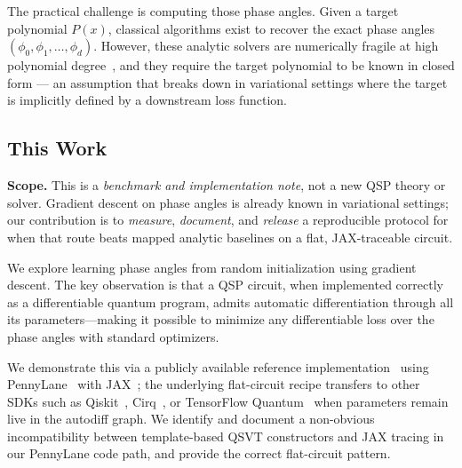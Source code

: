 \documentclass[11pt,a4paper]{article}
\begin{document}
The practical challenge is computing those phase angles. Given a target polynomial $P(x)$, classical algorithms exist to recover the exact phase angles $(\phi_0, \phi_1, \ldots, \phi_d)$. However, these analytic solvers are numerically fragile at high polynomial degree~\cite{haah2019product, chao2020finding}, and they require the target polynomial to be known in closed form --- an assumption that breaks down in variational settings where the target is implicitly defined by a downstream loss function.

\subsection{This Work}

\textbf{Scope.} This is a \emph{benchmark and implementation note}, not a new QSP theory or solver. Gradient descent on phase angles is already known in variational settings; our contribution is to \emph{measure}, \emph{document}, and \emph{release} a reproducible protocol for when that route beats mapped analytic baselines on a flat, JAX-traceable circuit.

We explore learning phase angles from random initialization using gradient descent. The key observation is that a QSP circuit, when implemented correctly as a differentiable quantum program, admits automatic differentiation through all its parameters---making it possible to minimize any differentiable loss over the phase angles with standard optimizers.

We demonstrate this via a publicly available reference implementation~\cite{peili_trainable_qsp_2026} using PennyLane~\cite{pennylane2022} with JAX~\cite{jax2018github}; the underlying flat-circuit recipe transfers to other SDKs such as Qiskit~\cite{qiskit2024}, Cirq~\cite{cirq2024}, or TensorFlow Quantum~\cite{broughton2020tfq} when parameters remain live in the autodiff graph. We identify and document a non-obvious incompatibility between template-based QSVT constructors and JAX tracing in our PennyLane code path, and provide the correct flat-circuit pattern.
\end{document}
